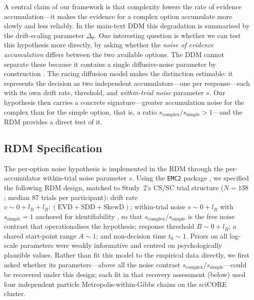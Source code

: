 \documentclass[man,floatsintext]{apa7}
\begin{document}
A central claim of our framework is that complexity lowers the rate of evidence accumulation---it makes the evidence for a complex option accumulate more slowly and less reliably. In the main-text DDM this degradation is summarised by the drift-scaling parameter $\Delta_\theta$. One interesting question is whether we can test this hypothesis more directly, by asking whether the \emph{noise of evidence accumulation} differs between the two available options. The DDM cannot separate these because it contains a single diffusive-noise parameter by construction \parencite{donkin_overconstraint_2009,stevenson_emc2_2026}. The racing diffusion model \parencite[RDM;][]{tillman_sequential_2020} makes the distinction estimable: it represents the decision as two independent accumulators---one per response---each with its own drift rate, threshold, and \emph{within-trial noise} parameter $s$. Our hypothesis then carries a concrete signature---greater accumulation noise for the complex than for the simple option, that is, a ratio $s_{\text{complex}} / s_{\text{simple}} > 1$---and the RDM provides a direct test of it.

\subsection{RDM Specification}

The per-option noise hypothesis is implemented in the RDM through the per-accumulator within-trial noise parameter $s$. Using the \texttt{EMC2} package \parencite{stevenson_emc2_2026}, we specified the following RDM design, matched to Study~2's CS/SC trial structure ($N = 138$; median 87 trials per participant): drift rate $v \sim 0 + l_R + l_R : (\text{EVD} + \text{SDD} + \text{SkewD})$; within-trial noise $s \sim 0 + l_R$ with $s_{\text{simple}} = 1$ anchored for identifiability \parencite{donkin_overconstraint_2009}, so that $s_{\text{complex}} / s_{\text{simple}}$ is the free noise contrast that operationalises the hypothesis; response threshold $B \sim 0 + l_R$; a shared start-point range $A \sim 1$; and non-decision time $t_0 \sim 1$. Priors on all log-scale parameters were weakly informative and centred on psychologically plausible values. Rather than fit this model to the empirical data directly, we first asked whether its parameters---above all the noise contrast $s_{\text{complex}} / s_{\text{simple}}$---could be recovered under this design; each fit in that recovery assessment (below) used four independent particle Metropolis-within-Gibbs chains on the sciCORE cluster.
\end{document}
